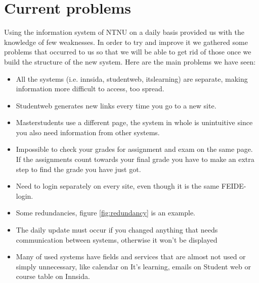 \section{Current problems}

Using the information system of NTNU on a daily basis provided us with the knowledge of few weaknesses. In order to try and improve it we gathered some problems that occurred to us so that we will be able to get rid of those once we build the structure of the new system. Here are the main problems we have seen:
\begin{itemize}

\item{All the systems (i.e. innsida, studentweb, itslearning) are separate, making information more difficult to access, too spread.}
\item{Studentweb generates new links every time you go to a new site.}
\item{Masterstudents use a different page, the system in whole is unintuitive since you also need information from other systems.}
\item{Impossible to check your grades for assignment and exam on the same page. If the assignments count towards your final grade you have to make an extra step to find the grade you have just got.}
\item{Need to login separately on every site, even though it is the same FEIDE-login.}
\item{Some redundancies, figure \textcolor{blue}{\ref{fig:redundancy}} is an example.}
\item{The daily update must occur if you changed anything that needs communication between systems, otherwise it won't be displayed}
\item{Many of used systems have fields and services that are almost not used or simply unnecessary, like calendar on It's learning, emails on Student web or course table on Innsida. }
\end{itemize}


